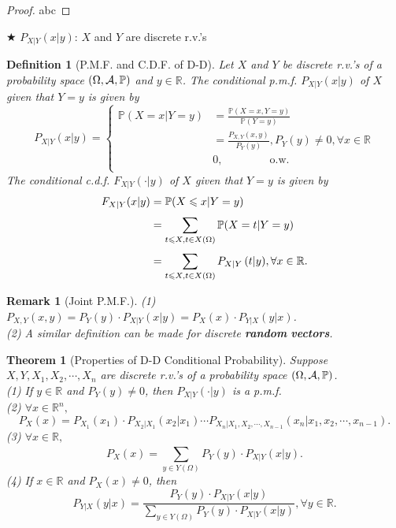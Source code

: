 \documentclass[openany,12pt]{book}
\newtheorem{theorem}{Theorem}[chapter]
\newtheorem{remark}{Remark}[chapter]
\newtheorem{definition}{Definition}[chapter]
\begin{document}
\begin{proof}
  abc
\end{proof}

$\bigstar$ $P_{X|Y}(x|y)$: $X$ and $Y$ are discrete r.v.'s

\begin{definition}[P.M.F. and C.D.F. of D-D]
  Let $X$ and $Y$ be discrete r.v.'s of a probability space
  $(\Omega,\mathcal{A},\mathbb{P})$ and $y \in \mathbb{R}$. The conditional p.m.f. $P_{X|Y}(x|y)$ of $X$ given that $Y = y$ is given by
  \[P_{X|Y}(x|y)= \left\{ \begin{aligned}
      \mathbb{P}( X = x | Y = y) & = \frac{\mathbb{P}(X = x,Y = y)}{\mathbb{P}(Y = y)}                      \\
                                  & = \frac{P_{X,Y}(x,y)}{P_{Y}(y)},P_{Y}(y) \neq 0,\forall x \in \mathbb{R} \\
                                  & 0, \qquad\qquad~\text{o.w.}~                                             \\
    \end{aligned} \right. \]
  The conditional c.d.f. $F_{X|Y}\left( \cdot | y \right)$ of $X$ given that $Y = y$ is given by
  \[\begin{aligned}
      F_{X|Y}(x|y) & = \mathbb{P}( X \leqslant x | Y = y)                                                             \\
                   & = \sum_{t \leqslant X, t \in X(\Omega)}^{}{\mathbb{P}( X = t | Y = y)}                           \\
                   & = \sum_{t \leqslant X, t \in X(\Omega)}^{}{P_{X|Y}\left( t | y \right)},\forall x \in \mathbb{R}.
    \end{aligned}\]
\end{definition}

\begin{remark}[Joint P.M.F.]
  (1) $P_{X,Y}(x,y)= P_{Y}(y) \cdot P_{X|Y}(x|y)= P_{X}(x) \cdot P_{Y|X}(y|x)$.\\
  (2) A similar definition can be made for discrete \textbf{random} \textbf{vectors}.
\end{remark}

\begin{theorem}[Properties of D-D Conditional Probability]
  Suppose $X,Y,X_{1},X_{2}, \cdots,X_{n}$ are discrete r.v.'s of a
  probability space $(\Omega,\mathcal{A},\mathbb{P})$.\\
  (1) If $y \in \mathbb{R}$ and $P_{Y}(y) \neq 0$, then $P_{X|Y}\left( \cdot | y \right)$ is a p.m.f.\\
  (2) $\forall x \in \mathbb{R}^{n},$
  \[P_{X}(x)= P_{X_{1}}(x_{1}) \cdot P_{X_{2}|X_{1}}\left( x_{2}|x_{1} \right) \cdots P_{X_{n}|X_{1},X_{2}, \cdots,X_{n - 1}}\left( x_{n}|x_{1},x_{2}, \cdots,x_{n - 1} \right).\]
  (3) $\forall x \in \mathbb{R},$
  \[P_{X}(x)= \sum_{y \in Y(\Omega)}^{}{P_{Y}(y)} \cdot P_{X|Y}(x|y).\]
  (4) If $x \in \mathbb{R}$ and $P_{X}(x) \neq 0$, then
  \[P_{Y|X}(y|x)= \frac{P_{Y}(y) \cdot P_{X|Y}(x|y)}{\sum_{y \in Y(\Omega)}^{}{P_{Y}(y)} \cdot P_{X|Y}(x|y)},\forall y \in \mathbb{R}.\]
\end{theorem}
\end{document}

